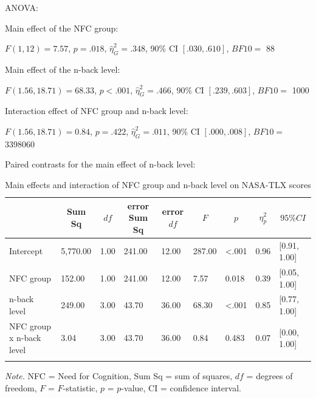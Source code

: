 \documentclass[
  man,floatsintext]{apa6}
\begin{document}
ANOVA:

Main effect of the NFC group:

\(F(1, 12) = 7.57\), \(p = .018\), \(\hat{\eta}^2_G = .348\), 90\% CI \([.030, .610]\), \(BF10=\) 88

Main effect of the n-back level:

\(F(1.56, 18.71) = 68.33\), \(p < .001\), \(\hat{\eta}^2_G = .466\), 90\% CI \([.239, .603]\), \(BF10=\) 1000

Interaction effect of NFC group and n-back level:

\(F(1.56, 18.71) = 0.84\), \(p = .422\), \(\hat{\eta}^2_G = .011\), 90\% CI \([.000, .008]\), \(BF10=\) 3398060

Paired contrasts for the main effect of n-back level:

\begin{table}[H]

\begin{center}
\begin{threeparttable}

\caption{\label{tab:unnamed-chunk-11}Main effects and interaction of NFC group and n-back level on NASA-TLX scores}

\footnotesize{

\begin{tabular}{lllllllll}
\toprule
 & \multicolumn{1}{c}{Sum Sq} & \multicolumn{1}{c}{$df$} & \multicolumn{1}{c}{error Sum Sq} & \multicolumn{1}{c}{error $df$} & \multicolumn{1}{c}{$F$} & \multicolumn{1}{c}{$p$} & \multicolumn{1}{c}{$\eta_{p}^{2}$} & \multicolumn{1}{c}{$95\% CI$}\\
\midrule
Intercept & 5,770.00 & 1.00 & 241.00 & 12.00 & 287.00 & <.001 & 0.96 & {}[0.91, 1.00]\\
NFC group & 152.00 & 1.00 & 241.00 & 12.00 & 7.57 & 0.018 & 0.39 & {}[0.05, 1.00]\\
n-back level & 249.00 & 3.00 & 43.70 & 36.00 & 68.30 & <.001 & 0.85 & {}[0.77, 1.00]\\
NFC group x n-back level & 3.04 & 3.00 & 43.70 & 36.00 & 0.84 & 0.483 & 0.07 & {}[0.00, 1.00]\\
\bottomrule
\addlinespace
\end{tabular}

}

\begin{tablenotes}[para]
\normalsize{\textit{Note.} NFC = Need for Cognition, Sum Sq = sum of squares, $df$ = degrees of freedom, $F$ = $F$-statistic, $p$ = $p$-value, CI = confidence interval.}
\end{tablenotes}

\end{threeparttable}
\end{center}

\end{table}
\end{document}
